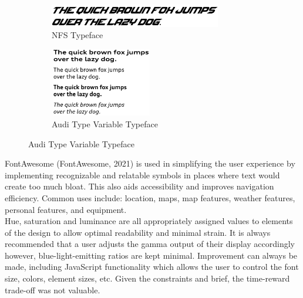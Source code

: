 \documentclass[11pt, english]{article}
\begin{document}
	\begin{figure}[H]
	\begin{center}
		\begin{subfigure}[t]{8cm}
                \begin{center}
                        \includegraphics[width=7.5cm,height=1cm]{../System/Photos/nfs.png}
                \end{center}
                        \caption{NFS Typeface}
                \end{subfigure}
                \begin{subfigure}[t]{5cm}
                \begin{center}
                        \includegraphics[width=4.5cm,height=3cm]{../System/Photos/audi.png}
                \end{center}
                        \caption{Audi Type Variable Typeface}
                \end{subfigure}
	\end{center}
	\end{figure}

	FontAwesome (FontAwesome, 2021) is used in simplifying the user experience by implementing recognizable and relatable symbols in places where text would create too much bloat. This also aids accessibility and improves navigation efficiency. Common uses include: location, maps, map features, weather features, personal features, and equipment.\\ 

	Hue, saturation and luminance are all appropriately assigned values to elements of the design to allow optimal readability and minimal strain. It is always recommended that a user adjusts the gamma output of their display accordingly however, blue-light-emitting ratios are kept minimal. Improvement can always be made, including JavaScript functionality which allows the user to control the font size, colors, element sizes, etc. Given the constraints and brief, the time-reward trade-off was not valuable.
\end{document}
